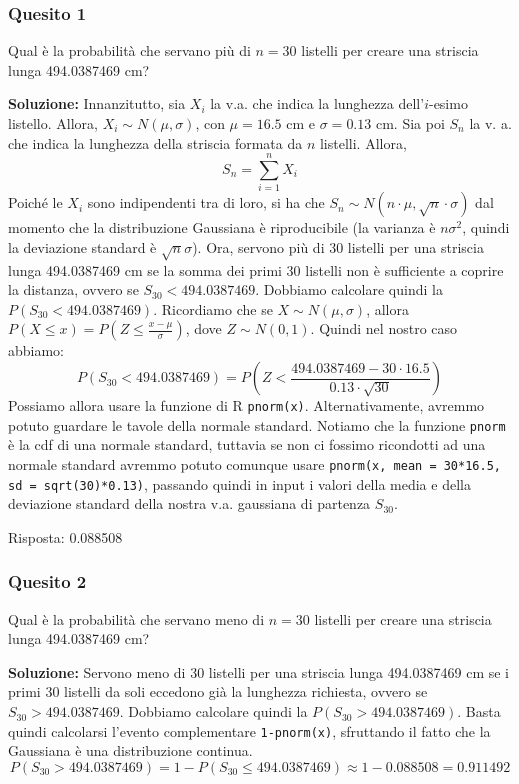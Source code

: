 \documentclass[12pt, a4paper]{article}
\begin{document}
\subsubsection*{Quesito 1}
Qual è la probabilità che servano più di $n=30$ listelli per creare una striscia lunga 494.0387469 cm?

\textbf{Soluzione:}
Innanzitutto, sia $X_i$ la v.a. che indica la lunghezza dell’$i$-esimo listello. Allora, $X_i \sim N(\mu,\sigma)$, con $\mu=16.5$ cm e $\sigma=0.13$ cm.
Sia poi $S_n$ la v. a. che indica la lunghezza della striscia formata da $n$ listelli. Allora, 
$$ S_n = \sum_{i=1}^n X_i $$
Poiché le $X_i$ sono indipendenti tra di loro, si ha che $S_n \sim N(n \cdot \mu, \sqrt{n} \cdot \sigma)$ dal momento che la distribuzione Gaussiana è riproducibile (la varianza è $n\sigma^2$, quindi la deviazione standard è $\sqrt{n}\sigma$).
Ora, servono più di 30 listelli per una striscia lunga 494.0387469 cm se la somma dei primi 30 listelli non è sufficiente a coprire la distanza, ovvero se $S_{30} < 494.0387469$. Dobbiamo calcolare quindi la $P(S_{30} < 494.0387469)$.
Ricordiamo che se $X \sim N(\mu,\sigma)$, allora $P(X \leq x) = P\left(Z \leq \frac{x-\mu}{\sigma}\right)$, dove $Z \sim N(0,1)$.
Quindi nel nostro caso abbiamo:
$$ P(S_{30} < 494.0387469) = P\left(Z < \frac{494.0387469 - 30 \cdot 16.5}{0.13 \cdot \sqrt{30}}\right) $$
Possiamo allora usare la funzione di R \texttt{pnorm(x)}. Alternativamente, avremmo potuto guardare le tavole della normale standard.
Notiamo che la funzione \texttt{pnorm} è la cdf di una normale standard, tuttavia se non ci fossimo ricondotti ad una normale standard avremmo potuto comunque usare \texttt{pnorm(x, mean = 30*16.5, sd = sqrt(30)*0.13)}, passando quindi in input i valori della media e della deviazione standard della nostra v.a. gaussiana di partenza $S_{30}$.

Risposta: 0.088508

\subsubsection*{Quesito 2}
Qual è la probabilità che servano meno di $n=30$ listelli per creare una striscia lunga 494.0387469 cm?

\textbf{Soluzione:}
Servono meno di 30 listelli per una striscia lunga 494.0387469 cm se i primi 30 listelli da soli eccedono già la lunghezza richiesta, ovvero se $S_{30} > 494.0387469$. Dobbiamo calcolare quindi la $P(S_{30} > 494.0387469)$.
Basta quindi calcolarsi l'evento complementare \texttt{1-pnorm(x)}, sfruttando il fatto che la Gaussiana è una distribuzione continua.
$$ P(S_{30} > 494.0387469) = 1 - P(S_{30} \leq 494.0387469) \approx 1 - 0.088508 = 0.911492 $$
\end{document}
